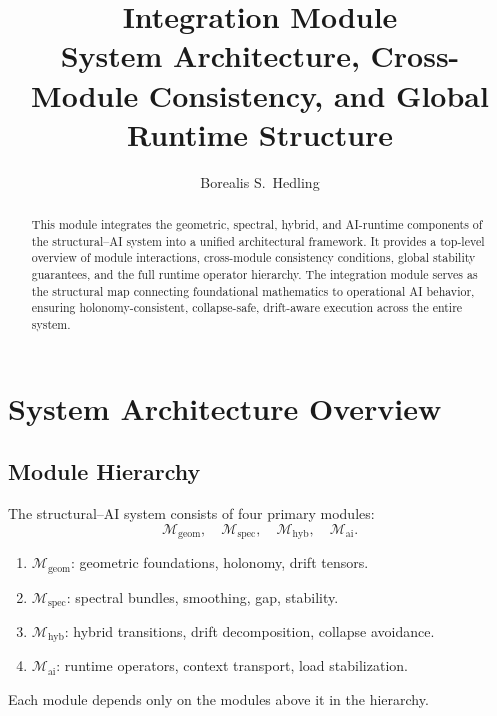 \documentclass[11pt]{article}
\title{\textbf{Integration Module}\\[4pt]
\large System Architecture, Cross-Module Consistency, and Global Runtime Structure}
\author{Borealis S.~Hedling}
\date{}
\begin{document}
\maketitle

\begin{abstract}
This module integrates the geometric, spectral, hybrid, and AI-runtime
components of the structural--AI system into a unified architectural
framework. It provides a top-level overview of module interactions,
cross-module consistency conditions, global stability guarantees, and the
full runtime operator hierarchy. The integration module serves as the
structural map connecting foundational mathematics to operational AI
behavior, ensuring holonomy-consistent, collapse-safe, drift-aware
execution across the entire system.
\end{abstract}

\tableofcontents
\newpage


\section{System Architecture Overview}

\subsection{Module Hierarchy}

\begin{definition}
The structural--AI system consists of four primary modules:
\[
\mathcal{M}_\mathrm{geom},\quad
\mathcal{M}_\mathrm{spec},\quad
\mathcal{M}_\mathrm{hyb},\quad
\mathcal{M}_\mathrm{ai}.
\]
\end{definition}

\begin{enumerate}
    \item $\mathcal{M}_\mathrm{geom}$: geometric foundations, holonomy, drift tensors.
    \item $\mathcal{M}_\mathrm{spec}$: spectral bundles, smoothing, gap, stability.
    \item $\mathcal{M}_\mathrm{hyb}$: hybrid transitions, drift decomposition, collapse avoidance.
    \item $\mathcal{M}_\mathrm{ai}$: runtime operators, context transport, load stabilization.
\end{enumerate}

\begin{lemma}
Each module depends only on the modules above it in the hierarchy.
\end{lemma}
\end{document}
